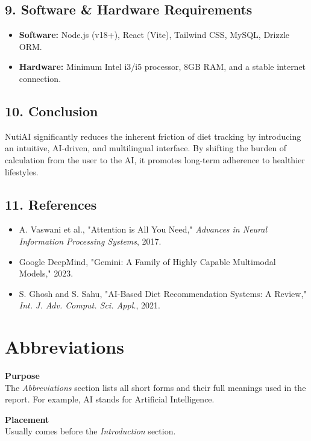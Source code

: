 \documentclass[12pt,a4paper]{report}
\begin{document}
\subsection*{9. Software \& Hardware Requirements}
\begin{itemize}[leftmargin=*]
    \item \textbf{Software:} Node.js (v18+), React (Vite), Tailwind CSS, MySQL, Drizzle ORM.
    \item \textbf{Hardware:} Minimum Intel i3/i5 processor, 8GB RAM, and a stable internet connection.
\end{itemize}

\subsection*{10. Conclusion}
NutiAI significantly reduces the inherent friction of diet tracking by introducing an intuitive, AI-driven, and multilingual interface. By shifting the burden of calculation from the user to the AI, it promotes long-term adherence to healthier lifestyles.

\subsection*{11. References}
\begin{itemize}[leftmargin=*]
    \item [1] A. Vaswani et al., "Attention is All You Need," \textit{Advances in Neural Information Processing Systems}, 2017.
    \item [2] Google DeepMind, "Gemini: A Family of Highly Capable Multimodal Models," 2023.
    \item [3] S. Ghosh and S. Sahu, "AI-Based Diet Recommendation Systems: A Review," \textit{Int. J. Adv. Comput. Sci. Appl.}, 2021.
\end{itemize}


\newpage
\section*{\centering Abbreviations}

\textbf{Purpose} \\
The \textit{Abbreviations} section lists all short forms and their full meanings used in the report. For example, AI stands for Artificial Intelligence.

\textbf{Placement} \\
Usually comes before the \textit{Introduction} section.
\end{document}
